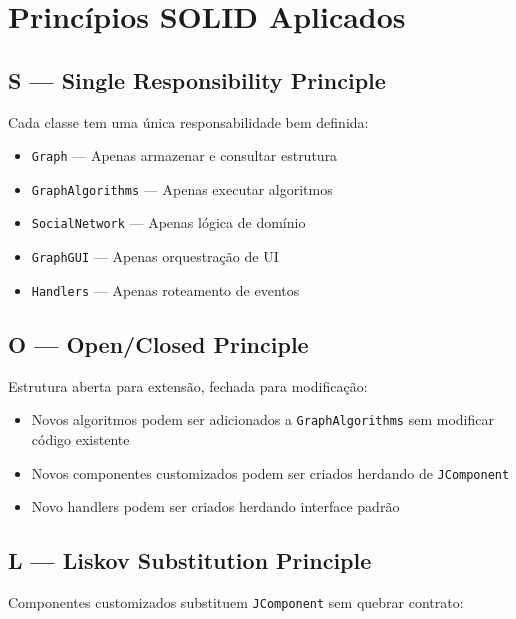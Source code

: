 \documentclass[12pt,a4paper]{article}
\begin{document}
\section{Princípios SOLID Aplicados}

\subsection{S — Single Responsibility Principle}

Cada classe tem uma única responsabilidade bem definida:

\begin{itemize}
    \item \texttt{Graph} — Apenas armazenar e consultar estrutura
    \item \texttt{GraphAlgorithms} — Apenas executar algoritmos
    \item \texttt{SocialNetwork} — Apenas lógica de domínio
    \item \texttt{GraphGUI} — Apenas orquestração de UI
    \item \texttt{Handlers} — Apenas roteamento de eventos
\end{itemize}

\subsection{O — Open/Closed Principle}

Estrutura aberta para extensão, fechada para modificação:

\begin{itemize}
    \item Novos algoritmos podem ser adicionados a \texttt{GraphAlgorithms} sem modificar código existente
    \item Novos componentes customizados podem ser criados herdando de \texttt{JComponent}
    \item Novo handlers podem ser criados herdando interface padrão
\end{itemize}

\subsection{L — Liskov Substitution Principle}

Componentes customizados substituem \texttt{JComponent} sem quebrar contrato:
\end{document}
